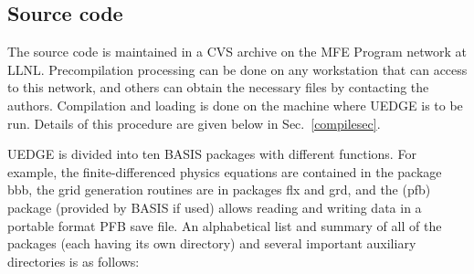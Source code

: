 \documentclass [12pt]{article}
\begin{document}
\subsection{Source code} \label{sourcsec}

The source code is maintained in a CVS archive on the MFE Program network at
LLNL. Precompilation processing can be done on any workstation that can access
to this network, and others can obtain the necessary files by contacting the
authors.  Compilation and loading is done on the machine where {\sf UEDGE} is
to be run.  Details of this procedure are given below in
Sec.~\ref{compilesec}.

{\sf UEDGE} is divided into ten {\sf BASIS} packages with different functions.
For example, the finite-differenced physics equations are contained in the
package {\sf bbb}, the grid generation routines are in packages {\sf flx} and
{\sf grd}, and the ({\sf pfb}) package (provided by {\sf BASIS} if used) allows
reading and writing data in a portable format PFB save file.  An alphabetical
list and summary of all of the packages (each having its own directory) and
several important auxiliary directories is as follows:
\end{document}
